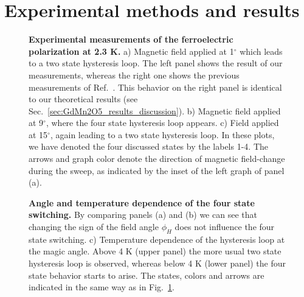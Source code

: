 \section{Experimental methods and results}
\begin{figure}
    \centering
\caption{ \label{fig:GdMn2O5_experiment1} {\bf Experimental measurements of the ferroelectric polarization at 2.3 K.} a) Magnetic field applied at 1$^\circ$ which leads to a two state hysteresis loop. The left panel shows the result of our measurements, whereas the right one shows the previous measurements of Ref.~\cite{Lee13}. This behavior on the right panel is identical to our theoretical results (see Sec.~\ref{sec:GdMn2O5_results_discussion}). b) Magnetic field applied at 9$^\circ$, where the four state hysteresis loop appears. c) Field applied at 15$^\circ$, again leading to a two state hysteresis loop.  
In these plots, we have denoted the four discussed states by the labels 1-4. The arrows and graph color denote the direction of magnetic field-change during the sweep, as indicated by the inset of the left graph of panel (a).}
\end{figure}
\begin{figure}
    \centering
\caption{ \label{fig:GdMn2O5_experiment2} {\bf Angle and temperature dependence of the four state switching.} By comparing panels (a) and (b) we can see that changing the sign of the field angle $\phi_H$ does not influence the four state switching. c) Temperature dependence of the hysteresis loop at the magic angle. Above 4 K (upper panel) the more usual two state hysteresis loop is observed, whereas below 4 K (lower panel) the four state behavior starts to arise. The states, colors and arrows are indicated in the same way as in Fig.~\ref{fig:GdMn2O5_experiment1}.}
\end{figure}

